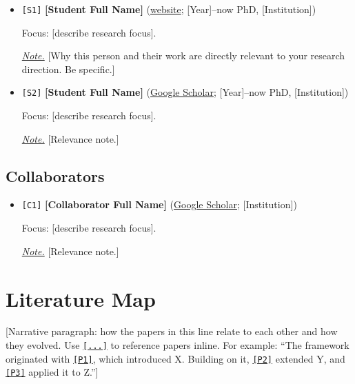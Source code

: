 \documentclass[10pt]{article}
\newcommand{\papercode}[1]{\textcolor{papergreen}{\texttt{[#1]}}}
\newcommand{\personcode}[1]{\textcolor{personpurple}{\texttt{[#1]}}}
\newcommand{\pmrl}[1]{\underline{\textit{#1}}}
\newcommand{\papercoderef}[1]{\hyperref[paper:#1]{\papercode{#1}}}
\begin{document}
\begin{itemize}[leftmargin=*]

\item {}\label{person:S1}\personcode{S1}
\textbf{[Student Full Name]}
(\href{https://example.com}{website};
[Year]--now PhD, [Institution])

Focus: [describe research focus].

\pmrl{Note.} [Why this person and their work are directly relevant to
your research direction. Be specific.]

\item {}\label{person:S2}\personcode{S2}
\textbf{[Student Full Name]}
(\href{https://scholar.google.com}{Google Scholar};
[Year]--now PhD, [Institution])

Focus: [describe research focus].

\pmrl{Note.} [Relevance note.]

\end{itemize}

\subsection{Collaborators}

\begin{itemize}[leftmargin=*]

\item {}\label{person:C1}\personcode{C1}
\textbf{[Collaborator Full Name]}
(\href{https://scholar.google.com}{Google Scholar}; [Institution])

Focus: [describe research focus].

\pmrl{Note.} [Relevance note.]

\end{itemize}

\section{Literature Map}

[Narrative paragraph: how the papers in this line relate to each other
and how they evolved. Use \papercoderef{...} to reference papers inline.
For example: ``The framework originated with \papercoderef{P1}, which
introduced X. Building on it, \papercoderef{P2} extended Y, and
\papercoderef{P3} applied it to Z.'']
\end{document}
